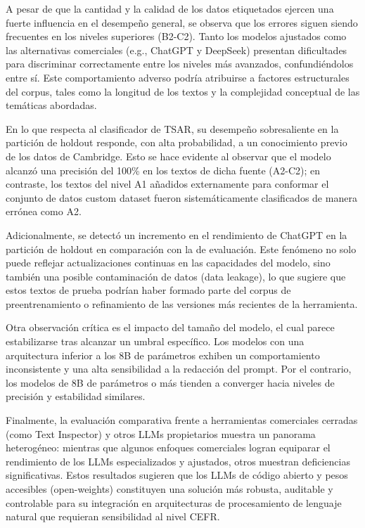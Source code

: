 A pesar de que la cantidad y la calidad de los datos etiquetados ejercen una fuerte influencia en el desempeño general, se observa que los errores siguen siendo frecuentes en los niveles superiores (B2-C2). Tanto los modelos ajustados como las alternativas comerciales (e.g., ChatGPT y DeepSeek) presentan dificultades para discriminar correctamente entre los niveles más avanzados, confundiéndolos entre sí. Este comportamiento adverso podría atribuirse a factores estructurales del corpus, tales como la longitud de los textos y la complejidad conceptual de las temáticas abordadas.

En lo que respecta al clasificador de TSAR, su desempeño sobresaliente en la partición de holdout responde, con alta probabilidad, a un conocimiento previo de los datos de Cambridge. Esto se hace evidente al observar que el modelo alcanzó una precisión del 100\% en los textos de dicha fuente (A2-C2); en contraste, los textos del nivel A1 añadidos externamente para conformar el conjunto de datos custom dataset fueron sistemáticamente clasificados de manera errónea como A2.

Adicionalmente, se detectó un incremento en el rendimiento de ChatGPT en la partición de holdout en comparación con la de evaluación. Este fenómeno no solo puede reflejar actualizaciones continuas en las capacidades del modelo, sino también una posible contaminación de datos (data leakage), lo que sugiere que estos textos de prueba podrían haber formado parte del corpus de preentrenamiento o refinamiento de las versiones más recientes de la herramienta.

Otra observación crítica es el impacto del tamaño del modelo, el cual parece estabilizarse tras alcanzar un umbral específico. Los modelos con una arquitectura inferior a los 8B de parámetros exhiben un comportamiento inconsistente y una alta sensibilidad a la redacción del prompt. Por el contrario, los modelos de 8B de parámetros o más tienden a converger hacia niveles de precisión y estabilidad similares.

Finalmente, la evaluación comparativa frente a herramientas comerciales cerradas (como Text Inspector) y otros LLMs propietarios muestra un panorama heterogéneo: mientras que algunos enfoques comerciales logran equiparar el rendimiento de los LLMs especializados y ajustados, otros muestran deficiencias significativas. Estos resultados sugieren que los LLMs de código abierto y pesos accesibles (open-weights) constituyen una solución más robusta, auditable y controlable para su integración en arquitecturas de procesamiento de lenguaje natural que requieran sensibilidad al nivel CEFR.

